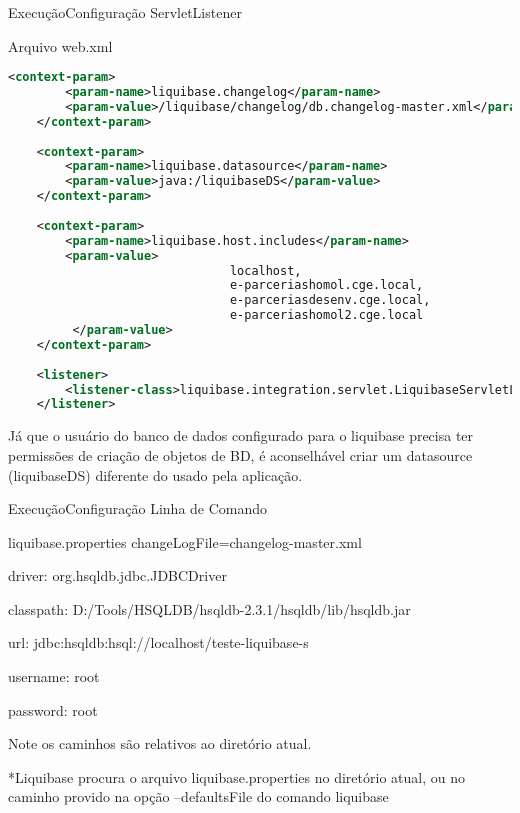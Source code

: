 \begin{frame}[fragile]{Execução}{Configuração ServletListener}
\begin{block}{Arquivo web.xml}
    \begin{lstlisting}[language=XML]
    <context-param>
        <param-name>liquibase.changelog</param-name>
        <param-value>/liquibase/changelog/db.changelog-master.xml</param-value>
    </context-param>
    
    <context-param>
        <param-name>liquibase.datasource</param-name>
        <param-value>java:/liquibaseDS</param-value>
    </context-param>
    
    <context-param>
        <param-name>liquibase.host.includes</param-name>
        <param-value>
                               localhost,
                               e-parceriashomol.cge.local,
                               e-parceriasdesenv.cge.local,
                               e-parceriashomol2.cge.local
         </param-value>
    </context-param>
    
    <listener>
        <listener-class>liquibase.integration.servlet.LiquibaseServletListener</listener-class>
    </listener>
    \end{lstlisting}
\end{block}

\tiny *Já que o usuário do banco de dados configurado para o liquibase precisa ter permissões de criação de objetos de BD, é aconselhável criar um datasource (liquibaseDS) diferente do usado pela aplicação.

\end{frame}

\begin{frame}[c]{Execução}{Configuração Linha de Comando}

\begin{block}{liquibase.properties}
    changeLogFile=changelog-master.xml
    
    driver: org.hsqldb.jdbc.JDBCDriver
    
    classpath: D:/Tools/HSQLDB/hsqldb-2.3.1/hsqldb/lib/hsqldb.jar
    
    url: jdbc:hsqldb:hsql://localhost/teste-liquibase-s
    
    username: root 
    
    password: root
\end{block}

\tiny *Note os caminhos são relativos ao diretório atual.

\tiny **Liquibase procura o arquivo liquibase.properties no diretório atual, ou no caminho provido na opção --defaultsFile do comando liquibase
\end{frame}

